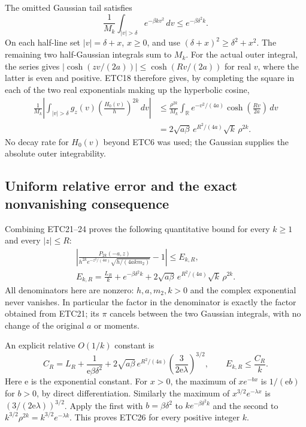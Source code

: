 The omitted Gaussian tail satisfies
\begin{equation}\tag{ETC23}
 \frac1{M_k}\int_{|v|>\delta}e^{-\beta kv^2}\,dv
                              \le e^{-\beta\delta^2 k}.
\end{equation}
On each half-line set $|v|=\delta+x$, $x\ge0$, and use
$(\delta+x)^2\ge\delta^2+x^2$. The remaining two
half-Gaussian integrals sum to $M_k$.
For the actual outer integral, the series gives
$|\cosh(zv/(2a))|\le\cosh(Rv/(2a))$ for real $v$,
where the latter is even and positive. ETC18 therefore
gives, by completing the square in each of the two real
exponentials making up the hyperbolic cosine,
\begin{equation}\tag{ETC24}
\begin{split}
 \frac1{M_k}\left|\int_{|v|>\delta}g_z(v)\left(\frac{H_0(v)}{h}\right)^{2k}\,dv\right|
 &\le\frac{\rho^{2k}}{M_k}\int_{\mathbb R}
                 e^{-v^2/(4a)}\cosh\left(\frac{Rv}{2a}\right)\,dv\\
 &=2\sqrt{a\beta}\,e^{R^2/(4a)}\sqrt{k}\,\rho^{2k}.
\end{split}
\end{equation}
No decay rate for $H_0(v)$ beyond ETC6 was used; the
Gaussian supplies the absolute outer integrability.

\subsection{Uniform relative error and the exact nonvanishing consequence}

Combining ETC21--24 proves the following quantitative bound
for every $k\ge1$ and every $|z|\le R$:
\begin{equation}\tag{ETC25}
\boxed{\begin{gathered}
 \left|
 \frac{P_{2k}(-a,z)}{
       h^{2k}e^{-z^2/(4a)}\sqrt{h/(4akm_2)}}-1
 \right|\le E_{k,R},\\
 E_{k,R}=\frac{L_R}{k}+e^{-\beta\delta^2k}
          +2\sqrt{a\beta}\,e^{R^2/(4a)}\sqrt{k}\,\rho^{2k}.
\end{gathered}}
\end{equation}
All denominators here are nonzero: $h,a,m_2,k>0$ and the
complex exponential never vanishes. In particular the
factor in the denominator is exactly the factor obtained
from ETC21; its $\pi$ cancels between the two Gaussian
integrals, with no change of the original $a$ or moments.

An explicit relative $O(1/k)$ constant is
\begin{equation}\tag{ETC26}
 \boxed{\displaystyle
 C_R=L_R+\frac1{\mathrm e\beta\delta^2}
       +2\sqrt{a\beta}\,e^{R^2/(4a)}
                         \left(\frac{3}{2\mathrm e\lambda}\right)^{3/2},
 \qquad E_{k,R}\le\frac{C_R}{k}.}
\end{equation}
Here $\mathrm e$ is the exponential constant. For $x>0$,
the maximum of $xe^{-bx}$ is $1/(\mathrm e b)$ for
$b>0$, by direct differentiation. Similarly the maximum
of $x^{3/2}e^{-\lambda x}$ is
$(3/(2\mathrm e\lambda))^{3/2}$. Apply the first with
$b=\beta\delta^2$ to $k e^{-\beta\delta^2k}$ and the
second to $k^{3/2}\rho^{2k}=k^{3/2}e^{-\lambda k}$.
This proves ETC26 for every positive integer $k$.


